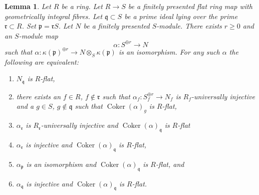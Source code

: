 \documentclass[10pt,a4paper]{amsart}
\theoremstyle{plain}
\newtheorem{lemma}[subsection]{Lemma}
\theoremstyle{definition}
\theoremstyle{remark}
\numberwithin{equation}{subsection}
\def\Coker{\mathop{\mathrm{Coker}}}
\begin{document}
\begin{lemma}
\label{lemma-induction-step-fp}
Let $R$ be a ring. Let $R \to S$ be a finitely presented
flat ring map with geometrically integral fibres. Let
$\mathfrak q \subset S$ be a prime ideal lying over the prime
$\mathfrak r \subset R$. Set $\mathfrak p = \mathfrak r S$.
Let $N$ be a finitely presented $S$-module.
There exists $r \geq 0$ and an $S$-module map
$$
\alpha : S^{\oplus r} \longrightarrow N
$$
such that
$\alpha : \kappa(\mathfrak p)^{\oplus r} \to N \otimes_S \kappa(\mathfrak p)$
is an isomorphism. For any such $\alpha$ the following are equivalent:
\begin{enumerate}
\item $N_{\mathfrak q}$ is $R$-flat,
\item there exists an $f \in R$, $f \not \in \mathfrak r$ such that
$\alpha_f : S_f^{\oplus r} \to N_f$ is $R_f$-universally injective and
a $g \in S$, $g \not \in \mathfrak q$ such that $\Coker(\alpha)_g$
is $R$-flat,
\item $\alpha_{\mathfrak r}$ is $R_{\mathfrak r}$-universally injective and
$\Coker(\alpha)_{\mathfrak q}$ is $R$-flat
\item $\alpha_{\mathfrak r}$ is injective and
$\Coker(\alpha)_{\mathfrak q}$ is $R$-flat,
\item $\alpha_{\mathfrak p}$ is an isomorphism and
$\Coker(\alpha)_{\mathfrak q}$ is $R$-flat, and
\item $\alpha_{\mathfrak q}$ is injective and
$\Coker(\alpha)_{\mathfrak q}$ is $R$-flat.
\end{enumerate}
\end{lemma}
\end{document}
